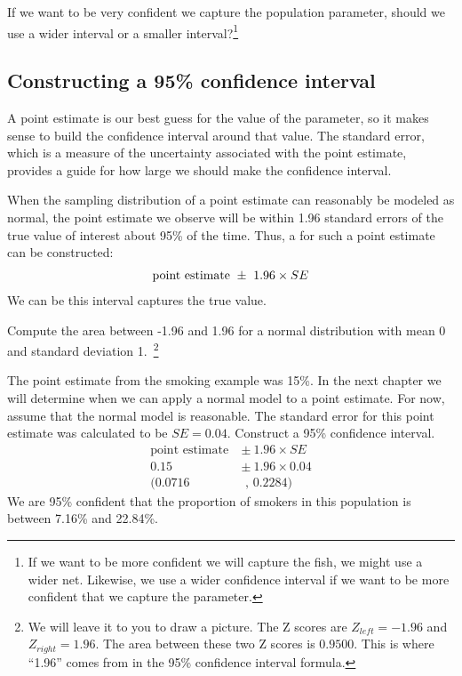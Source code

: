 \begin{exercise}
If we want to be very confident we capture the population parameter, should we use a wider interval or a smaller interval?\footnote{If we want to be more confident we will capture the fish, we might use a wider net. Likewise, we use a wider confidence interval if we want to be more confident that we capture the parameter.}
\end{exercise}


\subsection{Constructing a 95\% confidence interval}

A point estimate is our best guess for the value of the parameter, so it makes sense to build the confidence interval around that value. The standard error, which is a measure of the uncertainty associated with the point estimate, provides a guide for how large we should make the confidence interval.

\begin{termBox}{
When the sampling distribution of a point estimate can reasonably be modeled as normal, the point estimate we observe will be within 1.96 standard errors of the true value of interest about 95\% of the time. Thus, a  for such a point estimate can be constructed:\vspace{-2mm}
\begin{align}
\text{point estimate}\ \pm\ 1.96 \times SE\vspace{-2mm}
\label{95PercentConfidenceIntervalFormula}
\end{align}
We can be  this interval captures the true value.}
\end{termBox}

\begin{exercise}
Compute the area between -1.96 and 1.96 for a normal distribution with mean 0 and standard deviation 1.~\footnote{We will leave it to you to draw a picture. The Z scores are $Z_{left} = -1.96$ and $Z_{right} = 1.96$. The area between these two Z scores is $0.9500$. This is where ``1.96'' comes from in the 95\% confidence interval formula.}
\end{exercise}

\begin{example}{The point estimate from the smoking example was 15\%.  In the next chapter we will determine when we can apply a normal model to a point estimate.  For now, assume that the normal model is reasonable.  The standard error for this point estimate was calculated to be $SE = 0.04$. Construct a 95\% confidence interval.}
\begin{align*}
\text{point estimate}\ &\pm \ 1.96\times SE \\
0.15\  &\pm \ 1.96\times 0.04\\
(0.0716&\text{ , } 0.2284)
\end{align*}
We are 95\% confident that the proportion of smokers in this population is between 7.16\% and 22.84\%.  
\end{example}

